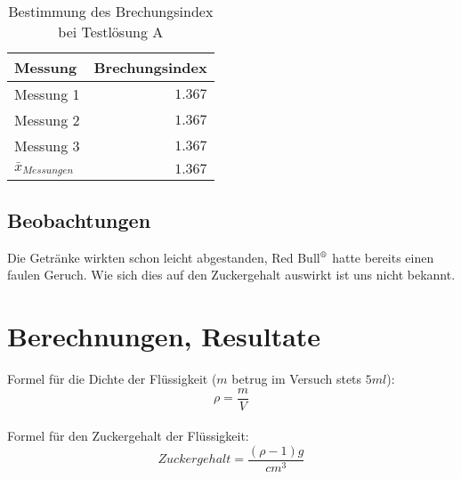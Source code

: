 \documentclass[a4paper]{article}
\newcommand{\superscript}[1]{\ensuremath{^{\textrm{#1}}}}
\begin{document}
\begin{table}[H]
\caption{Bestimmung des Brechungsindex bei Testlösung A}
\centering
\begin{tabular}{lr}
\toprule
Messung & Brechungsindex \\
\midrule
Messung 1 & \(1.367\) \\
Messung 2 & \(1.367\) \\
Messung 3 & \(1.367\) \\
\midrule
$\bar{x}_{Messungen}$ & \(1.367\) \\
\bottomrule
\end{tabular}
\end{table}

\vspace{5mm}

\subsection{Beobachtungen}

Die Getränke wirkten schon leicht abgestanden, Red Bull\superscript{\textregistered} hatte bereits einen faulen Geruch. Wie sich dies auf den Zuckergehalt auswirkt ist uns nicht bekannt.


\section{Berechnungen, Resultate}

Formel für die Dichte der Flüssigkeit (\(m\) betrug im Versuch stets \(5ml\)):
\[
	\rho = \frac{m}{V}
\]
\\
Formel für den Zuckergehalt der Flüssigkeit:
\[
	Zuckergehalt = \frac{(\rho-1)g}{cm^3}
\]
\\
\end{document}
